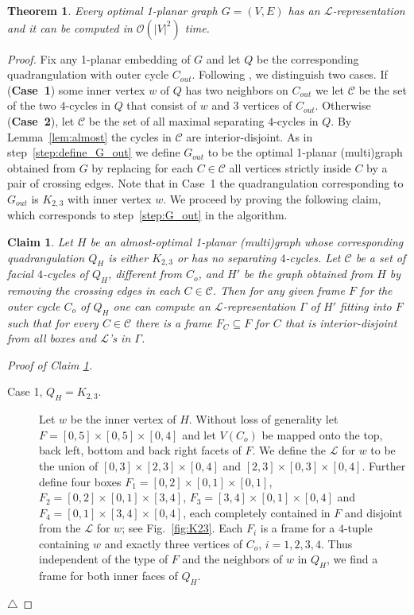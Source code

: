 \documentclass{article}
\newcounter{dummycount}
\newtheorem{theorem}{Theorem}
\newtheorem{claim}{Claim}
\newenvironment{claimproof}[1]{\noindent \textit{Proof of Claim #1.}}
{
\hfill $\triangle$\medskip
}
\newenvironment{backInTime}[1]
{
\setcounter{dummycount}{\value{theorem}}
\setcounter{theorem}{\value{#1}}
}
{
\setcounter{theorem}{\value{dummycount}}
}
\newcommand{\LL}{$\mathcal{L}$\xspace}
\newcommand{\Oh}{{\ensuremath{\mathcal{O}}}}
\begin{document}
\begin{backInTime}{thm-1-planar}
 \begin{theorem}
  Every optimal 1-planar graph $G=(V,E)$ has an \LL-representation and it can be computed in $\Oh(|V|^2)$ time.
 \end{theorem}
\end{backInTime}
\begin{proof}
 Fix any 1-planar embedding of $G$ and let $Q$ be the corresponding quadrangulation with outer cycle $C_{out}$. Following {\drawOpt},
we distinguish two cases.
 If (\textbf{Case~1}) some inner vertex $w$ of $Q$ has two neighbors on $C_{out}$ we let $\mathcal{C}$ be the set of the two $4$-cycles in $Q$ that consist of $w$ and 3 vertices of $C_{out}$.
 Otherwise (\textbf{Case~2}), let $\mathcal{C}$ be the set of all maximal separating $4$-cycles in $Q$.
By Lemma~\ref{lem:almost} the cycles in $\mathcal{C}$ are interior-disjoint.
 As in step~\ref{step:define_G_out} we define $G_{out}$ to be the optimal 1-planar (multi)graph obtained from $G$ by replacing for each $C \in \mathcal{C}$ all vertices strictly inside $C$ by a pair of crossing edges.
 Note that in Case~1 the quadrangulation corresponding to $G_{out}$ is $K_{2,3}$ with inner vertex $w$.
 We proceed by proving the following claim, which corresponds to step~\ref{step:G_out} in the algorithm.


 \begin{claim}
  Let $H$ be an almost-optimal 1-planar (multi)graph whose corresponding quadrangulation $Q_H$ is either $K_{2,3}$ or has no separating $4$-cycles.
  Let $\mathcal{C}$ be a set of facial $4$-cycles of $Q_H$, different from $C_{o}$, and $H'$ be the graph obtained from $H$ by removing the crossing edges in each $C \in \mathcal{C}$.
  Then for any given frame $F$ for the outer cycle $C_{o}$ of $Q_H$ one can compute an
 \LL-representation $\Gamma$ of $H'$ fitting into $F$ such that for every $C \in \mathcal{C}$ there is a frame $F_C \subseteq F$ for $C$ that is interior-disjoint from all boxes and \LL's in $\Gamma$.
\label{cl:two-case}
 \end{claim}
 \begin{claimproof}{\ref{cl:two-case}}
  \begin{description}
   \item[Case 1, $Q_H = K_{2,3}$.] Let $w$ be the inner vertex of $H$.
    Without loss of generality let $F = [0,5]\times[0,5]\times[0,4]$ and let $V(C_{o})$ be mapped onto the top, back left, bottom and back right facets of $F$.
    We define the \LL for $w$ to be the union of $[0,3]\times[2,3]\times[0,4]$ and $[2,3]\times[0,3]\times[0,4]$.
    Further define four boxes $F_1 = [0,2]\times[0,1]\times[0,1]$, $F_2 = [0,2]\times[0,1]\times[3,4]$, $F_3 = [3,4]\times[0,1]\times[0,4]$ and $F_4 = [0,1]\times[3,4]\times[0,4]$, each completely contained in $F$ and disjoint from the \LL for $w$; see Fig.~\ref{fig:K23}.
Each $F_i$ is a frame for a $4$-tuple containing $w$ and exactly three vertices of $C_{o}$, $i=1,2,3,4$.
    Thus independent of the type of $F$ and the neighbors of $w$ in $Q_H$, we find a frame for both inner faces of $Q_H$.


\end{description}
\end{claimproof}
\end{proof}
\end{document}
